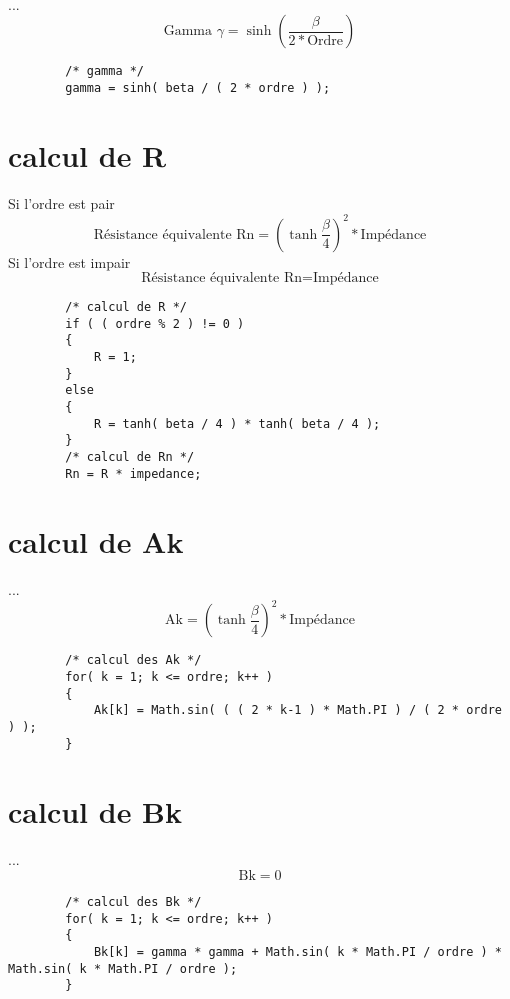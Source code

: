 \documentclass[a4paper,11pt]{article}
\begin{document}
    \paragraph{}
    ...\[ \mbox{Gamma } \gamma = \sinh( \frac{ \beta }{ 2 * \mbox{Ordre} } ) \]
    \begin{lstlisting}
        /* gamma */
        gamma = sinh( beta / ( 2 * ordre ) );
    \end{lstlisting}

\section{calcul de R}
    \paragraph{}
    Si l'ordre est pair \[ \mbox{Résistance équivalente Rn} = ( \tanh{ \frac{ \beta }{ 4 } } ) ^2 * \mbox{Impédance} \]
    Si l'ordre est impair \[ \mbox{Résistance équivalente Rn} = \mbox{Impédance} \]
    \begin{lstlisting}
        /* calcul de R */
        if ( ( ordre % 2 ) != 0 )
        {
            R = 1;
        }
        else
        {
            R = tanh( beta / 4 ) * tanh( beta / 4 );
        }
        /* calcul de Rn */
        Rn = R * impedance;
    \end{lstlisting}

\section{calcul de Ak }
    \paragraph{}
    ... \[ \mbox{Ak} = ( \tanh{ \frac{ \beta }{ 4 } } ) ^2 * \mbox{Impédance} \]
    \begin{lstlisting}
        /* calcul des Ak */
        for( k = 1; k <= ordre; k++ )
        {
            Ak[k] = Math.sin( ( ( 2 * k-1 ) * Math.PI ) / ( 2 * ordre ) );
        }
    \end{lstlisting}

\section{calcul de Bk }
    \paragraph{}
    ... \[ \mbox{Bk} = 0 \]
    \begin{lstlisting}
        /* calcul des Bk */
        for( k = 1; k <= ordre; k++ )
        {
            Bk[k] = gamma * gamma + Math.sin( k * Math.PI / ordre ) * Math.sin( k * Math.PI / ordre );
        }
    \end{lstlisting}
\end{document}
